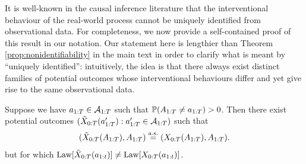 It is well-known in the causal inference literature that the interventional behaviour of the real-world process cannot be uniquely identified from observational data.
For completeness, we now provide a self-contained proof of this result in our notation.
Our statement here is lengthier than Theorem \ref{prop:nonidentifiability} in the main text in order to clarify what is meant by ``uniquely identified'': intuitively, the idea is that there always exist distinct families of potential outcomes whose interventional behaviours differ and yet give rise to the same observational data.

\begin{theorem}
    Suppose we have $a_{1:T} \in \mathcal{A}_{1:T}$ such that $\mathbb{P}(A_{1:T} \neq a_{1:T}) > 0$.
    Then there exist potential outcomes $(\tilde{X}_{0:T}(a_{1:T}') : a_{1:T}' \in \mathcal{A}_{1:T})$ such that %
    \begin{equation} \label{eq:nonidentifiability-proof-almost-sure-equality}
        (\tilde{X}_{0:T}(A_{1:T}), A_{1:T}) \overset{\mathrm{a.s.}}{=} (X_{0:T}(A_{1:T}), A_{1:T}).
    \end{equation}
    but for which $\mathrm{Law}[\tilde{X}_{0:T}(a_{1:t})] \neq \mathrm{Law}[X_{0:T}(a_{1:t})]$.
\end{theorem}

